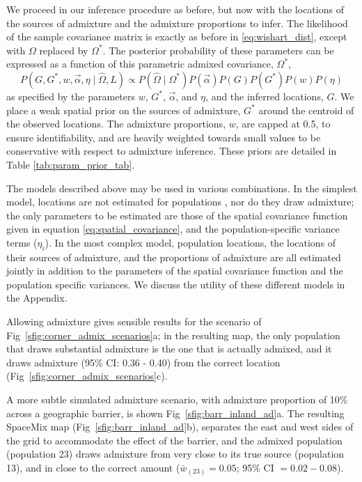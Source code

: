 \documentclass[10pt,letterpaper]{article}
\newcommand{\identifyadmixsource}[1]{{#1^{*}}}
\begin{document}
We proceed in our inference procedure as before, but now with the locations of the sources of admixture and the admixture proportions to infer.
The likelihood of the sample covariance matrix is exactly as before in \eqref{eq:wishart_dist},
except with $\Omega$ replaced by $\identifyadmixsource{\Omega}$.
The posterior probability of these parameters can be expressed as a function of this parametric admixed covariance, $\identifyadmixsource{\Omega}$,
\begin{equation}
\label{eq:admixed_post_prob}
P(G,\identifyadmixsource{G}, w,\vec{\alpha}, \eta \mid \widehat{\Omega}, L) 
	\propto  
		P(\widehat{\Omega}  \mid \identifyadmixsource{\Omega}) P(\vec{\alpha}) P(G) P(\identifyadmixsource{G}) P(w) P(\eta) 
\end{equation}
as specified by the parameters $w$, $\identifyadmixsource{G}$, $\vec{\alpha}$, and $\eta$, and the inferred locations, $G$.  
We place a weak spatial prior on the sources of admixture, $\identifyadmixsource{G}$ around the centroid of the observed locations. The admixture proportions, $w$, are capped at 0.5, to ensure identifiability,
and are heavily weighted towards small values to be conservative with respect to admixture inference.  
These priors are detailed in Table \ref{tab:param_prior_tab}.

The models described above may be used in various combinations.  In the simplest model, locations are not estimated for populations , nor do they draw admixture; the only parameters to be estimated are those of the spatial covariance function given in equation \eqref{eq:spatial_covariance}, and the population-specific variance terms ($\eta_i$).  In the most complex model, population locations, the locations of their sources of admixture, and the proportions of admixture are all estimated jointly in addition to the parameters of the spatial covariance function and the population specific variances.  We discuss the utility of these different models in the Appendix.

Allowing admixture gives sensible results for the scenario of Fig\ \ref{sfig:corner_admix_scenarios}a;
in the resulting map,
the only population that draws substantial admixture is the one that is actually admixed, 
and it draws admixture (95\% CI: 0.36 - 0.40) from the correct location (Fig\ \ref{sfig:corner_admix_scenarios}c).

A more subtle simulated admixture scenario, with admixture proportion of 10\% across a geographic barrier, 
is shown Fig\ \ref{sfig:barr_inland_ad}a.  
The resulting SpaceMix map (Fig\ \ref{sfig:barr_inland_ad}b), 
separates the east and west sides of the grid to accommodate the effect of the barrier,
and the admixed population (population 23) draws admixture from very close to its true source (population 13), 
and in close to the correct amount ($\bar{w}_{(23)} = 0.05$; 95\% CI $= 0.02-0.08$).
\end{document}
